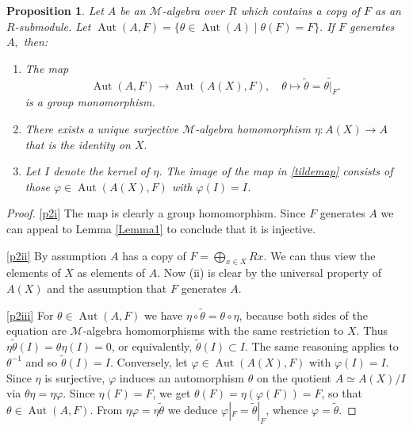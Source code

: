 \documentclass[10pt,a4paper]{amsart}
\newtheorem{prop}{Proposition}
\def\Aut{\ensuremath{\operatorname{Aut}}}
\def\Mu{\ensuremath{\mathcal{M}}}
\begin{document}
\begin{prop}\label{prop2} Let $A$ be an $\Mu$-algebra over $R$ which contains a copy of $F$ as an $R$-submodule. Let $\Aut(A,F) = \{ \theta \in \Aut(A) \mid \theta(F) = F\}.$ If  $F$ generates $A,$ then:

\begin{enumerate}[label = (\roman*)]
	\item \label{p2i} The map 
\begin{equation}\label{tildemap} \Aut(A,F) \to \Aut(A(X), F), \quad \theta \mapsto \widetilde \theta = \widetilde{\theta|_F}. \end{equation}
is a group monomorphism.

\item \label{p2ii}  There exists a unique surjective $\Mu$-algebra homomorphism $\eta\colon A(X) \to A$ that is the identity on $X.$ 

\item \label{p2iii} Let $I$ denote the kernel of $\eta$. The image of the map in \eqref{tildemap} consists of those $\varphi \in \Aut(A(X),F)$ with $\varphi(I) = I$.
\end{enumerate}
\end{prop}

\begin{proof}
	\ref{p2i} The map is clearly a group homomorphism. Since $F$ generates $A$ we can appeal to Lemma \ref{Lemma1} to conclude that it is injective.

	\ref{p2ii} By assumption $A$ has a copy of $F = \bigoplus_{x \in X} Rx.$ We can thus view the elements of $X$ as elements of $A$. Now (ii) is clear by the universal property of $A(X)$ and the assumption that $F$ generates $A.$

	\ref{p2iii} For $\theta \in \Aut(A,F)$ we have $\eta \circ \widetilde \theta = \theta \circ \eta$, because both sides of the equation are $\Mu$-algebra homomorphisms with the same restriction to $X.$
	Thus $\eta \widetilde \theta (I) = \theta \eta (I) = 0$, or equivalently, $\widetilde \theta(I) \subset I$. The same reasoning applies to $\theta^{-1}$ and so $\widetilde \theta(I) = I$.
	Conversely, let $\varphi \in \Aut(A(X),F)$ with $\varphi(I) = I$. 
	Since $\eta$ is surjective,  
	$\varphi$ induces an automorphism $\theta$ on the quotient $A \simeq A(X)/I$ via $\theta \eta = \eta \varphi$.  Since $\eta(F) = F$, we get $\theta(F) = \eta (\varphi(F)) = F$, so that $\theta \in \Aut(A,F)$.
	From $\eta \varphi = \eta \widetilde \theta$ we deduce $\varphi|_F = \widetilde \theta|_F$, whence $\varphi = \widetilde \theta$.
\end{proof}
\end{document}

